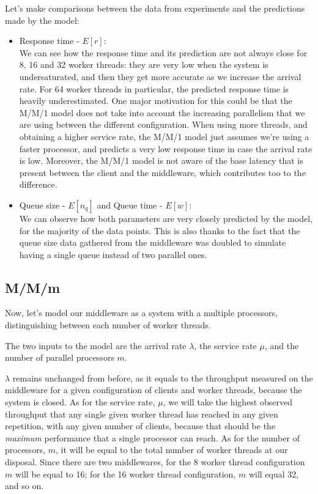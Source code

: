 \documentclass[11pt,a4paper]{article}
\begin{document}
Let's make comparisons between the data from experiments and the predictions made by the model:
\begin{itemize}
	\item Response time - $E[r]$: \\
		We can see how the response time and its prediction are not always close for 8, 16 and 32 worker 
		threads: they are very low when the system is undersaturated, and then they get
		more accurate as we increase the arrival rate. For 64 worker threads in particular,
		the predicted response time is heavily underestimated. 
		One major motivation for this could be that the M/M/1 model does not take into account the
		increasing parallelism that we are using between the different configuration. When using
		more threads, and obtaining a higher service rate, the M/M/1 model just assumes
		we're using a faster processor, and predicts a very low response time in case
		the arrival rate is low. Moreover, the M/M/1 model is not aware of the base latency
		that is present between the client and the middleware, which contributes too to 
		the difference.

	\item Queue size - $E[n_q]$ \hspace{3em} and \hspace{3em} Queue time - $E[w]$: \\
		We can observe how both parameters are very closely predicted by the model, for the 
		majority of the data points. This is also thanks to the fact that the queue size data
		gathered from the middleware was doubled to simulate having a single queue instead
		of two parallel ones.

\end{itemize}

\subsection{M/M/m}


Now, let's model our middleware as a system with a multiple processors, distinguishing
between each number of worker threads.

The two inputs to the model are the arrival rate $\lambda$, the service rate
$\mu$, and the number of parallel processors $m$.

$\lambda$ remains unchanged from before, as it equals to the throughput
measured on the middleware for a given configuration of clients and worker threads,
because the system is closed.
As for the service rate, $\mu$, we will take the highest observed throughput
that any single given worker thread has reached in any given repetition, with any given number
of clients, because that should be
the \emph{maximum} performance that a single processor can reach.
As for the number of processors, $m$, it will be equal to the total number of worker 
threads at our disposal. Since there are two middlewares, for the 8 worker thread
configuration $m$ will be equal to 16; for the 16 worker thread configuration,
$m$ will equal 32, and so on.
\end{document}
